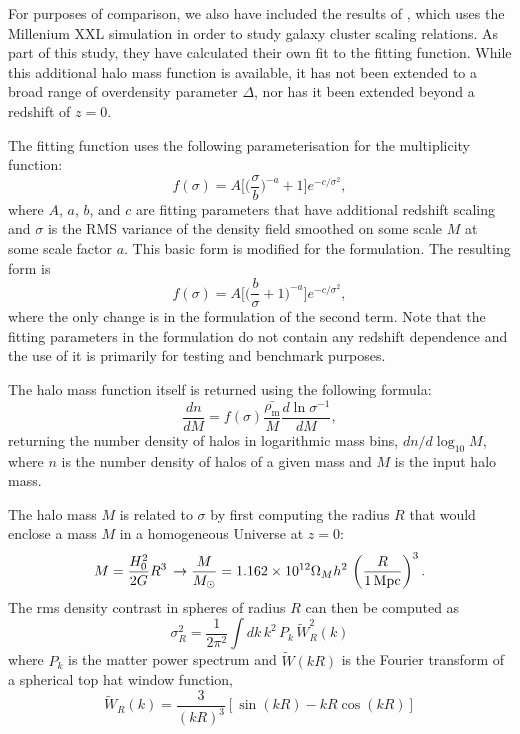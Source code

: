 \documentclass[\docopts]{\docclass}
\begin{document}
For purposes of comparison, we also have included the results of \citet{Angulo2012}, which uses the Millenium XXL simulation in order to study galaxy cluster scaling relations. As part of this study, they have calculated their own fit to the \citet{Tinker2010} fitting function. While this additional halo mass function is available, it has not been extended to a broad range of overdensity parameter $\Delta$, nor has it been extended beyond a redshift of $z = 0$.

The \citet{Tinker2008} fitting function uses the following parameterisation for the multiplicity function:
\begin{equation}
f(\sigma)=A\Big[\Big(\frac{\sigma}{b}\Big)^{-a}+1\Big]e^{-c/{\sigma}^2},
\end{equation}
where $A$, $a$, $b$, and $c$ are fitting parameters that have additional redshift scaling and $\sigma$ is the RMS variance of the density field smoothed on some scale $M$ at some scale factor $a$. This basic form is modified for the \citet{Angulo2012} formulation. The resulting form is
\begin{equation}
f(\sigma)=A\Big[\Big(\frac{b}{\sigma}+1\Big)^{-a}\Big]e^{-c/{\sigma}^2},
\end{equation}
where the only change is in the formulation of the second term. Note that the fitting parameters in the \citet{Angulo2012} formulation do not contain any redshift dependence and the use of it is primarily for testing and benchmark purposes.

The halo mass function itself is returned using the following formula:
\begin{equation}
\frac{dn}{dM}=f(\sigma)\frac{\bar{\rho_\mathrm{m}}}{M}\frac{d\ln{\sigma^{-1}}}{dM},
\end{equation}
returning the number density of halos in logarithmic mass bins, $dn/d\log_{10}{M}$, where $n$ is the number density of halos of a given mass and $M$ is the input halo mass.

The halo mass $M$ is related to $\sigma$ by first computing the radius $R$ that would enclose a mass $M$ in a homogeneous Universe at $z=0$:
\begin{equation}
  M=\frac{H_0^2}{2G}R^3\,\rightarrow \frac{M}{M_\odot}=1.162\times10^{12}\Omega_Mh^2\,\left(\frac{R}{1\,{\rm Mpc}}\right)^3.
\end{equation}
The rms density contrast in spheres of radius $R$ can then be computed as
\begin{equation}
  \sigma_R^2 = \frac{1}{2\pi^2}\int dk\,k^2\,P_k\,\tilde{W}_R^2(k)
  \label{eq:sigR}
\end{equation}
where $P_k$ is the matter power spectrum and $\tilde{W}(kR)$ is the Fourier transform of a spherical top hat window function,
\begin{equation}
\tilde{W}_R(k) = \frac{3}{(kR)^3}[\sin(kR)-kR\cos(kR)]
\end{equation}
\end{document}
